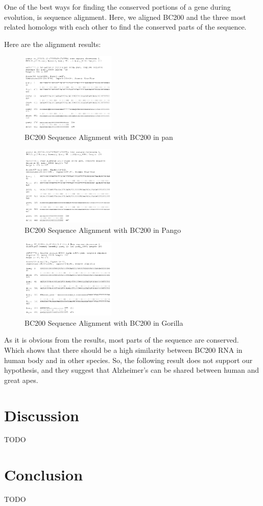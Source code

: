 \documentclass[conference]{IEEEtran}
\begin{document}
One of the best ways for finding the conserved portions of a gene during evolution, is sequence alignment. Here, we aligned BC200 and the three most related homologs with each other to find the conserved parts of the sequence.

Here are the alignment results:
\begin{figure}
  \centering
  \includegraphics[width=0.4\textwidth]{figs/TK1PBYHT114-Alignment-2-page-1.png}
  \caption{BC200 Sequence Alignment with BC200 in pan}
\end{figure}
\begin{figure}
  \centering
  \includegraphics[width=0.4\textwidth]{figs/TK1PBYHT114-Alignment-3-page-1.png}
  \caption{BC200 Sequence Alignment with BC200 in Pango}
\end{figure}
\begin{figure}
  \centering
  \includegraphics[width=0.4\textwidth]{figs/TK1PBYHT114-Alignment-page-1.png}
  \caption{BC200 Sequence Alignment with BC200 in Gorilla}
\end{figure}

As it is obvious from the results, most parts of the sequence are conserved. Which shows that there should be a high similarity between BC200 RNA in human body and in other species. So, the following result does not support our hypothesis, and they suggest that Alzheimer’s can be shared between human and great apes.

\section{Discussion}\label{sec:discussion}
TODO

\section{Conclusion}\label{sec:conclusion}
TODO



\end{document}
